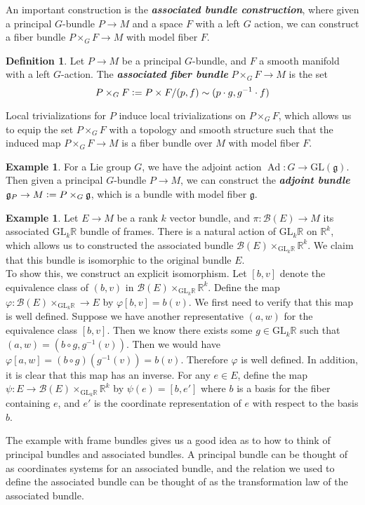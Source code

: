 \documentclass[psamsfonts, 12pt]{amsart}
\theoremstyle{definition}
\newtheorem{defn}[thm]{Definition}
\newtheorem{exmp}[thm]{Example}
\theoremstyle{remark}
\newcommand{\R}{\mathbb{R}}
\newcommand{\ib}[1]{\textbf{\textit{#1}}}
\newcommand{\GL}{\mathrm{GL}}
\newcommand{\g}{\mathfrak{g}}
\newcommand{\inv}{^{-1}}
\newcommand{\defeq}{\vcentcolon=}
\DeclareMathOperator{\Ad}{Ad}
\begin{document}
%
An important construction is the \ib{associated bundle construction}, where given
a principal $G$-bundle $P \to M$ and a space $F$ with a left $G$ action, we can
construct a fiber bundle $P\times_G F \to M$ with model fiber $F$.
%
\begin{defn}
Let $P \to M$ be a principal $G$-bundle, and $F$ a smooth manifold with a left $G$-action.
The \ib{associated fiber bundle} $P\times_G F \to M$ is the set
\[
P \times_G F \defeq P \times F / (p,f) \sim (p\cdot g, g\inv\cdot f)
\]
\end{defn}
%
Local trivializations for $P$ induce local trivializations on $P \times_G F$, which
allows us to equip the set $P \times_G F$ with a topology and smooth structure such
that the induced map $P\times_G F \to M$ is a fiber bundle over $M$ with model fiber $F$.
%
\begin{exmp}
For a Lie group $G$, we have the adjoint action $\Ad : G \to \GL(\g)$. Then given
a principal $G$-bundle $P \to M$, we can construct the \ib{adjoint bundle}
$\g_P \to M \defeq P \times_G \g$, which is a bundle with model fiber $\g$.
\end{exmp}
%
\begin{exmp}
Let $E \to M$ be a rank $k$ vector bundle, and $\pi : \mathcal{B}(E) \to M$ its associated
$\GL_k\R$ bundle of frames. There is a natural action of $\GL_k\R$ on $\R^k$, which
allows us to constructed the associated bundle $\mathcal{B}(E) \times_{\GL_k\R} \R^k$.
We claim that this bundle is isomorphic to the original bundle $E$. \\

To show this, we construct an explicit isomorphism. Let $[b,v]$ denote the equivalence
class of $(b,v)$ in $\mathcal{B}(E) \times_{\GL_k\R} \R^k$. Define the map
$\varphi : \mathcal{B}(E) \times_{\GL_k\R} \to E$ by $\varphi[b,v] = b(v)$.
We first need to verify that this map is well defined. Suppose we have another
representative $(a,w)$ for the equivalence class $[b,v]$. Then we know there
exists some $g \in \GL_k\R$ such that $(a,w) = (b \circ g, g\inv(v))$. Then we would
have $\varphi[a,w] = (b \circ g)(g\inv(v)) = b(v)$. Therefore $\varphi$ is well defined.
In addition, it is clear that this map has an inverse. For any $e \in E$, define
the map $\psi : E \to \mathcal{B}(E) \times_{\GL_k\R} \R^k$ by
$\psi(e) = [b, e']$ where $b$ is a basis for the fiber containing $e$, and $e'$ is
the coordinate representation of $e$ with respect to the basis $b$.
\end{exmp}
%
The example with frame bundles gives us a good idea as to how to think of
principal bundles and associated bundles. A principal bundle can be thought of as
coordinates systems for an associated bundle, and the relation we used to define
the associated bundle can be thought of as the transformation law of the associated
bundle. \\
\end{document}

